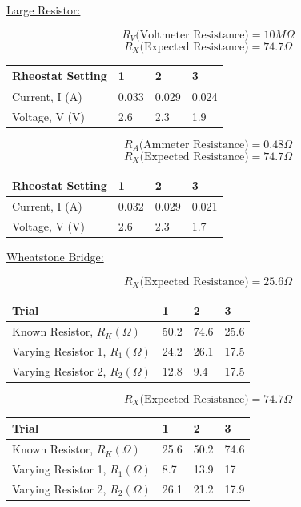 \documentclass[11pt, titlepage]{article}
\begin{document}
\underline{Large Resistor:}
\begin{center}
$$R_V \text{(Voltmeter Resistance)}= 10 M\Omega$$
$$R_X \text{(Expected Resistance)}= 74.7 \Omega$$
\begin{tabular}
{|m{9em}|m{7em}|m{7em}|m{7em}|}
\hline
Rheostat Setting & 1 & 2 & 3 \\
\hline
Current, I (A) & 0.033 & 0.029 & 0.024 \\
\hline
Voltage, V (V) & 2.6 & 2.3 & 1.9 \\
\hline
\end{tabular}
\end{center}

\begin{center}
$$R_A \text{(Ammeter Resistance)}= 0.48 \Omega$$
$$R_X \text{(Expected Resistance)}= 74.7 \Omega$$
\begin{tabular}
{|m{9em}|m{7em}|m{7em}|m{7em}|}
\hline
Rheostat Setting & 1 & 2 & 3 \\
\hline
Current, I (A) & 0.032 & 0.029 & 0.021 \\
\hline
Voltage, V (V) & 2.6 & 2.3 & 1.7 \\
\hline
\end{tabular}
\end{center}

\underline{Wheatstone Bridge:}
\begin{center}
$$R_X \text{(Expected Resistance)}= 25.6 \Omega$$
\begin{tabular}
{|m{9em}|m{7em}|m{7em}|m{7em}|}
\hline
Trial & 1 & 2 & 3 \\
\hline
Known Resistor, $R_K (\Omega)$ & 50.2 & 74.6 & 25.6 \\
\hline
Varying Resistor 1, $R_1 (\Omega)$ & 24.2 & 26.1 & 17.5 \\
\hline
Varying Resistor 2, $R_2 (\Omega)$ & 12.8 & 9.4 & 17.5 \\
\hline
\end{tabular}
\end{center}

\begin{center}
$$R_X \text{(Expected Resistance)}= 74.7 \Omega$$
\begin{tabular}
{|m{9em}|m{7em}|m{7em}|m{7em}|}
\hline
Trial & 1 & 2 & 3 \\
\hline
Known Resistor, $R_K (\Omega)$ & 25.6 & 50.2 & 74.6 \\
\hline
Varying Resistor 1, $R_1 (\Omega)$ & 8.7 & 13.9 & 17 \\
\hline
Varying Resistor 2, $R_2 (\Omega)$ & 26.1 & 21.2 & 17.9 \\
\hline
\end{tabular}
\end{center}
\end{document}
